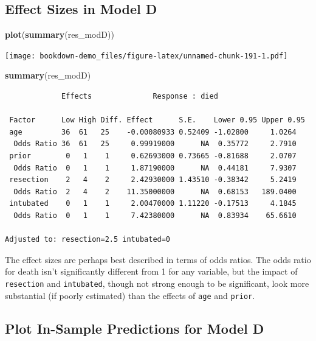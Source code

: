 \documentclass[]{book}
\newenvironment{Shaded}{\begin{snugshade}}{\end{snugshade}}
\newcommand{\KeywordTok}[1]{\textcolor[rgb]{0.13,0.29,0.53}{\textbf{#1}}}
\newcommand{\NormalTok}[1]{#1}
\theoremstyle{definition}
\theoremstyle{definition}
\theoremstyle{definition}
\theoremstyle{remark}
\begin{document}
\subsection{Effect Sizes in Model D}\label{effect-sizes-in-model-d}

\begin{Shaded}
\begin{Highlighting}[]
\KeywordTok{plot}\NormalTok{(}\KeywordTok{summary}\NormalTok{(res_modD))}
\end{Highlighting}
\end{Shaded}

\texttt{[image: bookdown-demo\_files/figure-latex/unnamed-chunk-191-1.pdf]}

\begin{Shaded}
\begin{Highlighting}[]
\KeywordTok{summary}\NormalTok{(res_modD)}
\end{Highlighting}
\end{Shaded}

\begin{verbatim}
             Effects              Response : died 

 Factor      Low High Diff. Effect      S.E.    Lower 0.95 Upper 0.95
 age         36  61   25    -0.00080933 0.52409 -1.02800     1.0264  
  Odds Ratio 36  61   25     0.99919000      NA  0.35772     2.7910  
 prior        0   1    1     0.62693000 0.73665 -0.81688     2.0707  
  Odds Ratio  0   1    1     1.87190000      NA  0.44181     7.9307  
 resection    2   4    2     2.42930000 1.43510 -0.38342     5.2419  
  Odds Ratio  2   4    2    11.35000000      NA  0.68153   189.0400  
 intubated    0   1    1     2.00470000 1.11220 -0.17513     4.1845  
  Odds Ratio  0   1    1     7.42380000      NA  0.83934    65.6610  

Adjusted to: resection=2.5 intubated=0  
\end{verbatim}

The effect sizes are perhaps best described in terms of odds ratios. The
odds ratio for death isn't significantly different from 1 for any
variable, but the impact of \texttt{resection} and \texttt{intubated},
though not strong enough to be significant, look more substantial (if
poorly estimated) than the effects of \texttt{age} and \texttt{prior}.

\subsection{Plot In-Sample Predictions for Model
D}\label{plot-in-sample-predictions-for-model-d}
\end{document}
